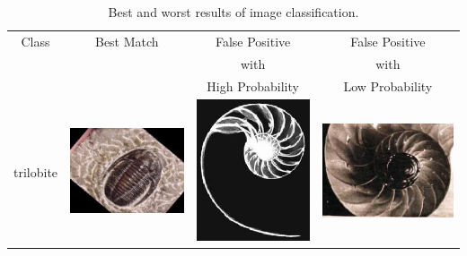 \documentclass{article}
\begin{document}
\begin{table}[Ht]
\caption{Best and worst results of image classification.}
\label{tab:results}
\begin{tabular}{| c | c | c | c |}
\hline
Class & Best Match & False Positive & False Positive \\
 & & with & with \\
 & & High Probability & Low Probability \\
\hline
trilobite &
\vspace{0cm}\includegraphics[scale=.1]{"Figures/Best Matches/bestmatch_c1"} &
\vspace{0cm}\includegraphics[scale=.1]{"Figures/False Matches/class_1_most_sure_wrong"} &
\vspace{0cm}\includegraphics[scale=.1]{"Figures/False Matches/class_1_least_sure_wrong"} \\

\end{tabular}
\end{table}
\end{document}
